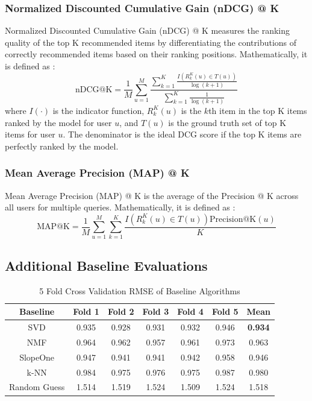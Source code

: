 \documentclass{article}
\begin{document}
\subsubsection{Normalized Discounted Cumulative Gain (nDCG) @ K}

Normalized Discounted Cumulative Gain (nDCG) @ K measures the ranking quality of the top K recommended items by differentiating the contributions of correctly recommended items based on their ranking positions. Mathematically, it is defined as \cite{survey}:
$$
\mbox{nDCG@K} = \frac{1}{M} \sum_{u = 1}^M \frac{\sum_{k = 1}^K \frac{I(R^K_k(u) \in T(u))}{\log(k + 1)}}{\sum_{k = 1}^K \frac{1}{ \log(k + 1)}}
$$
where $I(\cdot)$ is the indicator function, $R^K_k(u)$ is the $k$th item in the top K items ranked by the model for user $u$, and $T(u)$ is the ground truth set of top K items for user $u$. The denominator is the ideal DCG score if the top K items are perfectly ranked by the model.

\subsubsection{Mean Average Precision (MAP) @ K}

Mean Average Precision (MAP) @ K is the average of the Precision @ K across all users for multiple queries. Mathematically, it is defined as \cite{survey}:
$$
\mbox{MAP@K} = \frac{1}{M} \sum_{u = 1}^M \sum_{k = 1}^K \frac{I(R^K_k(u) \in T(u)) \mbox{Precision@K}(u)}{K}
$$


\subsection{Additional Baseline Evaluations} \label{additional-baseline-eval}



\begin{table}[H]
    \centering
        \begin{tabular}{|c c c c c c c|} 
         \hline
         Baseline & Fold 1 & Fold 2 & Fold 3 & Fold 4 & Fold 5 & Mean \\ [0.5ex] 
         \hline\hline
         SVD & 0.935 & 0.928 & 0.931 & 0.932 & 0.946 & \bfseries 0.934 \\ 
         \hline
         NMF & 0.964 & 0.962 & 0.957 & 0.961 & 0.973 & 0.963 \\
         \hline
         SlopeOne & 0.947 & 0.941 & 0.941 & 0.942 & 0.958 & 0.946 \\
         \hline
         k-NN & 0.984 & 0.975 & 0.976 & 0.975 & 0.987 & 0.980 \\
         \hline
         Random Guess & 1.514 & 1.519 & 1.524 & 1.509 & 1.524 & 1.518 \\ [1ex] 
         \hline
        \end{tabular}
    \caption{5 Fold Cross Validation RMSE of Baseline Algorithms}
    \label{tab:rmse_results}
\end{table}
\end{document}
